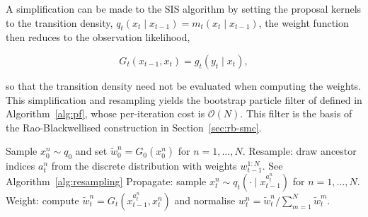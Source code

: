 A simplification can be made to the SIS algorithm by setting the proposal kernels to the transition density, $q_t(x_t \mid x_{t-1}) = m_t(x_t \mid x_{t-1})$, the weight function then reduces to the observation likelihood,

\begin{equation}
    G_t(x_{t-1}, x_t) = g_t(y_t \mid x_t),
\end{equation}

so that the transition density need not be evaluated when computing the weights. This simplification and resampling yields the bootstrap particle filter of \citet{gordonsalmondsmith1993} defined in Algorithm~\ref{alg:pf}, whose per-iteration cost is $\mathcal{O}(N)$. This filter is the basis of the Rao-Blackwellised construction in Section~\ref{sec:rb-smc}.

\begin{algorithm}[t]
\caption{Bootstrap particle filter}
\label{alg:pf}
\begin{algorithmic}[1]
\State Sample $x_0^n \sim q_0$ and set $\tilde{w}_0^n = G_0(x_0^n)$ for $n = 1, \ldots, N$.
    \State Resample: draw ancestor indices $a_t^n$ from the discrete distribution with weights $w_{t-1}^{1:N}$. See Algorithm~\ref{alg:resampling}
    \State Propagate: sample $x_t^n \sim q_t(\cdot \mid x_{t-1}^{a_t^n})$ for $n = 1, \ldots, N$.
    \State Weight: compute $\tilde{w}_t^n = G_t(x_{t-1}^{a_t^n}, x_t^n)$ and normalise $w_t^n = \tilde{w}_t^n / \sum_{m=1}^N \tilde{w}_t^m$.
\EndFor
\end{algorithmic}
\end{algorithm} 





